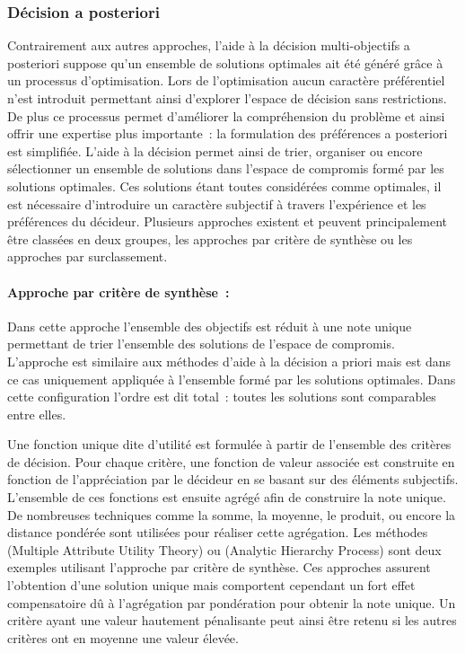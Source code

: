 \subsubsection{Décision a posteriori} %
\label{ssub:decision_a_posteriori}
Contrairement aux autres approches, l’aide à la décision multi-objectifs a posteriori
suppose qu’un ensemble de solutions optimales ait été généré grâce à un processus
d’optimisation. Lors de l’optimisation aucun caractère préférentiel
n’est introduit permettant ainsi d’explorer l’espace de décision sans restrictions.
De plus ce processus permet d’améliorer la compréhension du problème et ainsi
offrir une expertise plus importante~: la formulation des préférences a posteriori
est simplifiée.
L’aide à la décision permet ainsi de trier, organiser ou encore sélectionner un
ensemble de solutions dans l’espace de compromis formé par les solutions optimales.
Ces solutions étant toutes considérées comme optimales, il est nécessaire d’introduire
un caractère subjectif à travers l’expérience et les préférences du décideur.
Plusieurs approches existent et peuvent principalement être classées en deux groupes,
les approches par critère de synthèse ou les approches par surclassement.


\paragraph{Approche par critère de synthèse~:} %
\label{par:approche_par_critère_de_synthèse}
Dans cette approche l’ensemble des objectifs est réduit à une note unique permettant
de trier l’ensemble des solutions de l’espace de compromis.
L’approche est similaire aux méthodes d’aide à la décision a priori mais est dans
ce cas uniquement appliquée à l’ensemble formé par les solutions optimales. Dans cette
configuration l’ordre est dit total~: toutes les solutions sont comparables entre elles.

Une fonction unique dite d’utilité est formulée à partir de l’ensemble des critères
de décision. Pour chaque critère, une fonction de valeur associée est construite en
fonction de l’appréciation par le décideur en se basant sur des éléments subjectifs.
L’ensemble de ces fonctions est ensuite agrégé afin de construire la note unique.
De nombreuses techniques comme la somme, la moyenne, le produit, ou encore la distance
pondérée sont utilisées pour réaliser cette agrégation.
Les méthodes  (Multiple Attribute Utility Theory) \parencite{Fishburn1970}
ou  (Analytic Hierarchy Process) \parencite{Saaty1987161} sont deux exemples utilisant
l’approche par critère de synthèse.
Ces approches assurent l’obtention d’une solution unique mais comportent
cependant un fort effet compensatoire dû à l’agrégation par pondération pour
obtenir la note unique. Un critère ayant une valeur hautement pénalisante peut
ainsi être retenu si les autres critères ont en moyenne une valeur élevée.

